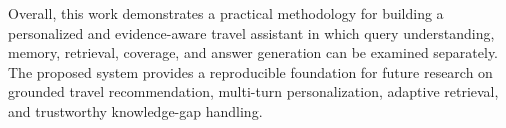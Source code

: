 Overall, this work demonstrates a practical methodology for building a
personalized and evidence-aware travel assistant in which query understanding,
memory, retrieval, coverage, and answer generation can be examined separately.
The proposed system provides a reproducible foundation for future research on
grounded travel recommendation, multi-turn personalization, adaptive retrieval,
and trustworthy knowledge-gap handling.
